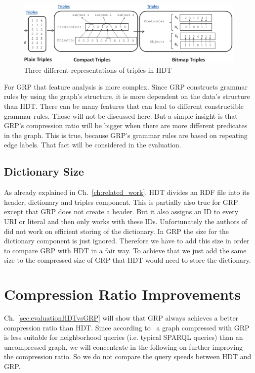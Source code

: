 \begin{figure}[h]
	\centering
	\includegraphics[width=1\textwidth]{figures/relatedwork/hdt1}
	\caption{Three different representations of triples in HDT}
	\label{fig:hdt_overview_1}
\end{figure}

For GRP that feature analysis is more complex. Since GRP constructs grammar rules by using the graph's structure, it is more dependent on the data's structure than HDT. There can be many features that can lead to different constructible grammar rules. Those will not be discussed here. But a simple insight is that GRP's compression ratio will be bigger when there are more different predicates in the graph. This is true, because GRP's grammar rules are based on repeating edge labels. That fact will be considered in the evaluation.

\subsection{Dictionary Size}

As already explained in Ch.~\ref{ch:related_work}, HDT divides an RDF file into its header, dictionary and triples component. This is partially also true for GRP except that GRP does not create a header. But it also assigns an ID to every URI or literal and then only works with these IDs. Unfortunately the authors of~\cite{maneth} did not work on efficient storing of the dictionary. In GRP the size for the dictionary component is just ignored. Therefore we have to add this size in order to compare GRP with HDT in a fair way. To achieve that we just add the same size to the compressed size of GRP that HDT would need to store the dictionary.


\section{Compression Ratio Improvements}\label{sec:approachComprRatioImprovements}

Ch.~\ref{sec:evaluationHDTvsGRP} will show that GRP always achieves a better compression ratio than HDT. Since according to~\cite{maneth} a graph compressed with GRP is less suitable for neighborhood queries (i.e. typical SPARQL queries) than an uncompressed graph, we will concentrate in the following on further improving the compression ratio. So we do not compare the query speeds between HDT and GRP.




